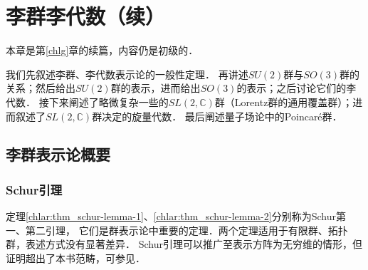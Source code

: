 

\chapter{李群李代数（续）}\label{chlar}

本章是第\ref{chlg}章的续篇，内容仍是初级的．

我们先叙述李群、李代数表示论的一般性定理．
再讲述$SU(2)$群与$SO(3)$群的关系；然后给出$SU(2)$群的表示，进而给出$SO(3)$的表示；之后讨论它们的李代数．
接下来阐述了略微复杂一些的$SL(2,\mathbb{C})$群（Lorentz群的通用覆盖群）；进而叙述了$SL(2,\mathbb{C})$群决定的旋量代数．
最后阐述量子场论中的Poincar\'{e}群．


\section{李群表示论概要}\label{chlar:sec_lr}

  

\subsection{Schur引理}

定理\ref{chlar:thm_schur-lemma-1}、\ref{chlar:thm_schur-lemma-2}分别称为Schur第一、第二引理，
它们是群表示论中重要的定理．两个定理适用于有限群、拓扑群，表述方式没有显著差异．
Schur引理可以推广至表示方阵为无穷维的情形，但证明超出了本书范畴，可参见\parencite[\S 6.9.10]{qiuws-2011}．


